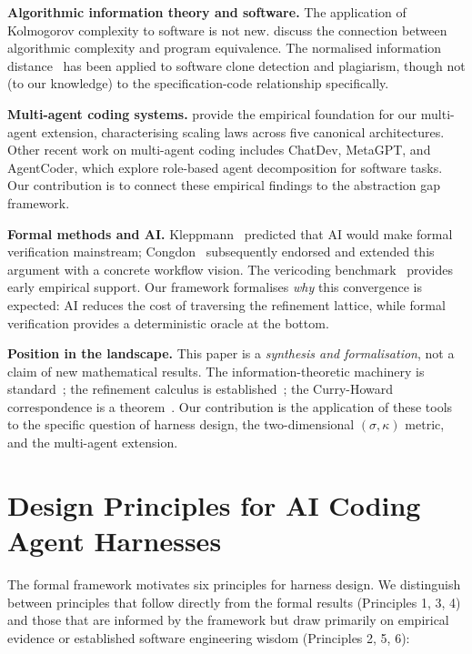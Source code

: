 \documentclass[11pt, a4paper, logo, copyright]{googledeepmind}
\begin{document}
\textbf{Algorithmic information theory and software.} The application of Kolmogorov complexity to software is not new. \citet{li2019introduction} discuss the connection between algorithmic complexity and program equivalence. The normalised information distance~\citep{li2004similarity} has been applied to software clone detection and plagiarism, though not (to our knowledge) to the specification-code relationship specifically.

\textbf{Multi-agent coding systems.} \citet{kim2025scaling} provide the empirical foundation for our multi-agent extension, characterising scaling laws across five canonical architectures. Other recent work on multi-agent coding includes ChatDev, MetaGPT, and AgentCoder, which explore role-based agent decomposition for software tasks. Our contribution is to connect these empirical findings to the abstraction gap framework.

\textbf{Formal methods and AI.} Kleppmann~\citep{kleppmann2025formal} predicted that AI would make formal verification mainstream; Congdon~\citep{congdon2025formal} subsequently endorsed and extended this argument with a concrete workflow vision. The vericoding benchmark~\citep{vericoding2025} provides early empirical support. Our framework formalises \emph{why} this convergence is expected: AI reduces the cost of traversing the refinement lattice, while formal verification provides a deterministic oracle at the bottom.

\textbf{Position in the landscape.} This paper is a \emph{synthesis and formalisation}, not a claim of new mathematical results. The information-theoretic machinery is standard~\citep{li2019introduction}; the refinement calculus is established~\citep{back1980correctness, morgan1994programming}; the Curry-Howard correspondence is a theorem~\citep{wadler2015propositions}. Our contribution is the application of these tools to the specific question of harness design, the two-dimensional $(\sigma, \kappa)$ metric, and the multi-agent extension.


\section{Design Principles for AI Coding Agent Harnesses}
\label{sec:design-principles}

The formal framework motivates six principles for harness design. We distinguish between principles that follow directly from the formal results (Principles 1, 3, 4) and those that are informed by the framework but draw primarily on empirical evidence or established software engineering wisdom (Principles 2, 5, 6):
\end{document}
